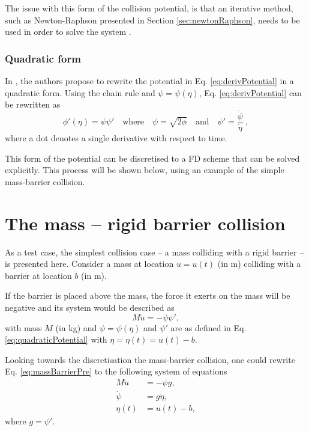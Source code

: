 The issue with this form of the collision potential, is that an iterative method, such as Newton-Raphson presented in Section \ref{sec:newtonRaphson}, needs to be used in order to solve the system \cite{Ducceschi2021}.

\subsubsection{Quadratic form}
In \cite{Ducceschi2021}, the authors propose to rewrite the potential in Eq. \eqref{eq:derivPotential} in a quadratic form. Using the chain rule and  $\psi = \psi(\eta)$, Eq. \eqref{eq:derivPotential} can be rewritten as
\begin{equation}\label{eq:quadraticPotential}
    \phi'(\eta) = \psi\psi' \quad \text{where} \quad \psi = \sqrt{2\phi} \quad \text{and} \quad \psi' = \frac{\dot{\psi}}{\dot{\eta}}\ ,
\end{equation}
where a dot denotes a single derivative with respect to time. 

This form of the potential can be discretised to a FD scheme that can be solved explicitly. This process will be shown below, using an example of the simple mass-barrier collision. 

\section{The mass -- rigid barrier collision}\label{sec:massRigidBarrier}
As a test case, the simplest collision case -- a mass colliding with a rigid barrier -- is presented here. Consider a mass at location $u = u(t)$ (in m) colliding with a barrier at location $b$ (in m).

If the barrier is placed above the mass, the force it exerts on the mass will be negative and its system would be described as
\begin{equation}\label{eq:massBarrierPre}
    M\ddot u = -\psi\psi',
\end{equation}
with mass $M$ (in kg) and $\psi = \psi(\eta)$ and $\psi'$ are as defined in Eq. \eqref{eq:quadraticPotential} with $\eta = \eta(t) = u(t) - b$. 

Looking towards the discretisation the mass-barrier collision, one could rewrite Eq. \eqref{eq:massBarrierPre} to the following system of equations
\begin{subequations}\label{eq:massBarrier}
    \begin{align}
        M\ddot u &= -\psi g,\label{eq:massBarrierPDE1}\\
        \dot\psi &= g \dot\eta,\label{eq:massBarrierPDE2}\\
        \eta(t) &= u(t) - b,\label{eq:massBarrierPDE3}
    \end{align}
\end{subequations} 
where $g = \psi'$.


